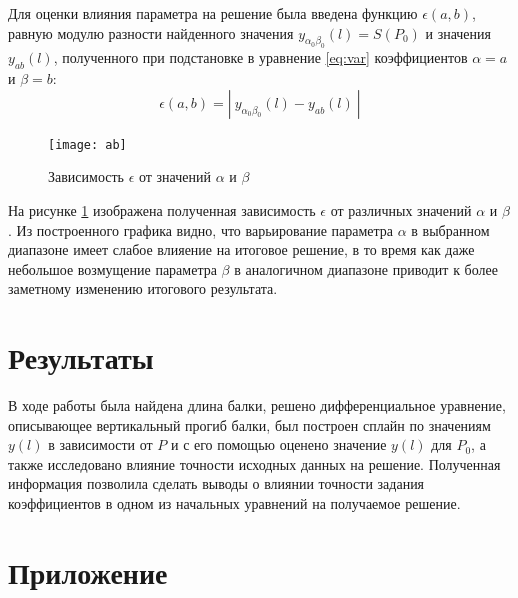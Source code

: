Для оценки влияния параметра на решение была введена функцию $\epsilon(a, b)$, равную модулю разности найденного значения $y_{\alpha_0\beta_0}(l) = S(P_0)$ и значения $y_{ab}(l)$, полученного при подстановке в уравнение \ref{eq:var} коэффициентов $\alpha = a$ и $\beta = b$:
\begin{equation}
	\epsilon(a, b) = |\ y_{\alpha_0\beta_0}(l) - y_{ab}(l)\ |
\end{equation}

\begin{figure}[H]
\begin{center}
	\vspace{-1cm}
	\texttt{[image: ab]}
	\caption{Зависимость $\epsilon$ от значений $\alpha$ и $\beta$}
	\label{plt:ab}
	\vspace{-0.5cm}
\end{center}
\end{figure}

На рисунке \ref{plt:ab} изображена полученная зависимость $\epsilon$ от различных значений $\alpha$ и $\beta$. Из построенного графика видно, что варьирование параметра  $\alpha$  в выбранном диапазоне имеет слабое влияение на итоговое решение, в то время как даже небольшое возмущение параметра  $\beta$  в аналогичном диапазоне приводит к более заметному изменению итогового результата.

\section{Результаты}

В ходе работы была найдена длина балки, решено дифференциальное уравнение, описывающее вертикальный прогиб балки, был построен сплайн по значениям $y(l)$ в зависимости от $P$ и с его помощью оценено значение $y(l)$ для $P_0$, а также исследовано влияние точности исходных данных на решение. Полученная информация позволила сделать выводы о влиянии точности задания коэффициентов в одном из начальных уравнений на получаемое решение.

\section*{Приложение}



